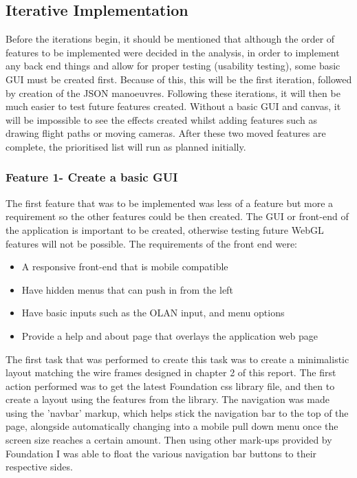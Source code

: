 \subsection{Iterative Implementation}
Before the iterations begin, it should be mentioned that although the order of features to be implemented were decided in the analysis, in order to implement any back end things and allow for proper testing (usability testing), some basic GUI must be created first. Because of this, this will be the first iteration, followed by creation of the JSON manoeuvres. Following these iterations, it will then be much easier to test future features created. Without a basic GUI and canvas, it will be impossible to see the effects created whilst adding features such as drawing flight paths or moving cameras. After these two moved features are complete, the prioritised list will run as planned initially.

\subsubsection{Feature 1- Create a basic GUI}
The first feature that was to be implemented was less of a feature but more a requirement so the other features could be then created. The GUI or front-end of the application is important to be created, otherwise testing future WebGL features will not be possible. The requirements of the front end were:

\begin{itemize}
\item A responsive front-end that is mobile compatible
\item Have hidden menus that can push in from the left
\item Have basic inputs such as the OLAN input, and menu options
\item Provide a help and about page that overlays the application web page
\end{itemize}

The first task that was performed to create this task was to create a minimalistic layout matching the wire frames designed in chapter 2 of this report. The first action performed was to get the latest Foundation \cite{foundation} css library file, and then to create a layout using the features from the library. The navigation was made using the 'navbar' markup, which helps stick the navigation bar to the top of the page, alongside automatically changing into a mobile pull down menu once the screen size reaches a certain amount. Then using other mark-ups provided by Foundation I was able to float the various navigation bar buttons to their respective sides. 

